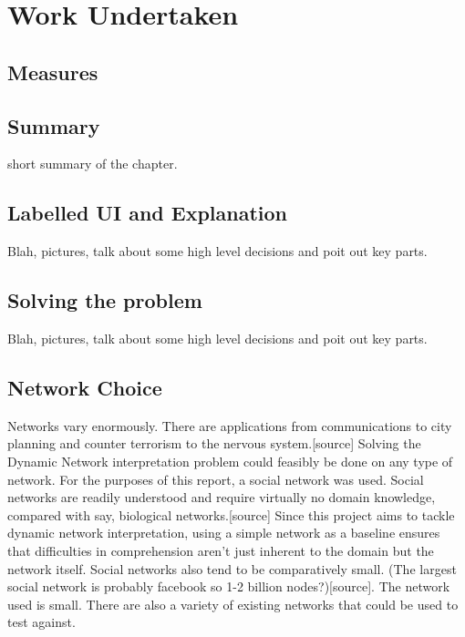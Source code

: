 
\chapter{Work Undertaken}

\section*{Measures}

\section*{Summary}
short summary of the chapter.

\section{Labelled UI and Explanation}
Blah, pictures, talk about some high level decisions and poit out key parts.

\section{Solving the problem}
Blah, pictures, talk about some high level decisions and poit out key parts.

\section{Network Choice}
Networks vary enormously. There are applications from communications to city planning and counter terrorism to the nervous system.[source] Solving the Dynamic Network interpretation problem could feasibly be done on any type of network. For the purposes of this report, a social network was used. Social networks are readily understood and require virtually no domain knowledge, compared with say, biological networks.[source] Since this project aims to tackle dynamic network interpretation, using a simple network as a baseline ensures that difficulties in comprehension aren’t just inherent to the domain but the network itself. Social networks also tend to be comparatively small. (The largest social network is probably facebook so 1-2 billion nodes?)[source]. The network used is small. There are also a variety of existing networks that could be used to test against.

